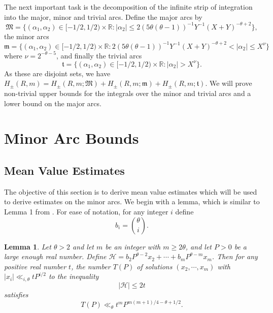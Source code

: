 \documentclass[11pt,reqno]{amsart}
\numberwithin{equation}{section}
\newtheorem{lemma}{Lemma}[section]
\begin{document}
The next important task is the decomposition of the infinite strip of integration into the major, minor and trivial arcs. Define the major arcs by 
\[ \mathfrak{M} = \big\{ (\alpha_1,\alpha_2) \in [-1/2,1/2)\times \mathbb{R} : |\alpha_2| \leq 2(5\theta(\theta-1))^{-1}Y^{-1}(X+Y)^{-\theta+2} \big\}, \] 
the minor arcs 
\[ \mathfrak{m} = \big\{ (\alpha_1,\alpha_2) \in [-1/2,1/2)\times \mathbb{R}: 2(5\theta(\theta-1))^{-1} Y^{-1}(X+Y)^{-\theta+2} < |\alpha_2| \leq X^{\nu} \big\} \] 
where $\nu = 2^{-\theta-5}$, and finally the trivial arcs \[ \mathfrak{t} = \{ (\alpha_1, \alpha_2) \in [-1/2,1/2) \times \mathbb{R}: |\alpha_2| > X^{\nu} \}.\] 
As these are disjoint sets, we have $H_{\pm}(R,m) = H_{\pm}(R,m; \mathfrak{M}) + H_{\pm}(R,m; \mathfrak{m}) +H_{\pm}(R,m; \mathfrak{t})$. We will prove non-trivial upper bounds for the integrals over the minor and trivial arcs and a lower bound on the major arcs. 

\section{Minor Arc Bounds} \label{sec:min}

\subsection{Mean Value Estimates} 
The objective of this section is to derive mean value estimates which will be used to derive estimates on the minor arcs. We begin with a lemma, which is similar to Lemma 1 from \cite{ArkhZhit}. For ease of notation, for any integer $i$ define 
\[ b_i = \binom{\theta}{i}. \]

\begin{lemma} \label{lem:arkzhit}
Let $\theta > 2$ and let $m$ be an integer with $m \geq 2\theta $, and let $P > 0$ be a large enough real number. Define $\mathcal{H} = b_2P^{\theta-2}x_2+\cdots+b_mP^{\theta-m}x_m$. Then for any positive real number $t$, the number $T(P)$ of solutions $(x_2, \cdots, x_m)$ with $|x_i| \ll_{i, \theta} tP^{i/2}$ to the inequality 
\[ |\mathcal{H}| \leq 2t \]
satisfies 
\[ T(P) \ll_{\theta} t^mP^{m(m+1)/4-\theta+1/2}. \]
\end{lemma}
\end{document}
